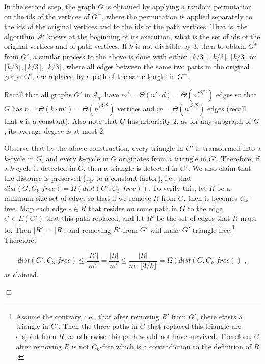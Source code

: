\documentclass{article}
\newcommand{\eps}{\epsilon}
\newcommand{\calA}{{\mathcal{A}}}
\newcommand{\mG}{{\mathcal{G}}}
\newcommand{\trn}{{n'}}
\newcommand{\trG}{{G'}}
\newcommand{\trm}{{m'}}
\newcommand{\trA}{{\calA'}}
\newcommand{\trR}{{R'}}
\newcommand{\tre}{e'}
\newenvironment{proofof}[1]{\smallskip\noindent{\bf Proof of #1:}}%
        {\hspace*{\fill}$\Box$\par}
\newcommand{\commentt}[1]{ {}}
\begin{document}
\begin{proofof}{Theorem~\ref{thm:lb_ck_const_alpha}}
In the second step, the graph $G$ is obtained by applying a random permutation on the ids of the vertices of $G^+$, where the permutation is applied separately to the ids of the original vertices and to the ids of the path vertices. That is, the algorithm $\trA$ knows at the beginning of its execution, what is the set of ids of the original vertices and  of path vertices. If $k$ is not divisible by $3$, then  to obtain $G^+$ from $\trG$, 
a similar process to the above is done with either $\lceil k/3\rceil, \lceil k/3\rceil, \lfloor k/3\rfloor$ or $\lceil k/3\rceil, \lfloor k/3\rfloor, \lfloor k/3\rfloor$, where all edges between the same two parts in the original graph $\trG$, are replaced by a path of the same length in $G^+$.


Recall that all graphs $\trG$ in $\mG_{\trn}$ have $\trm=\Theta(\trn\cdot d)=\Theta(\trn^{3/2})$ edges so that $G$ has $n=\Theta (k\cdot \trm)=\Theta(\trn^{3/2})$ vertices and  $m=\Theta(\trn^{3/2})$ edges (recall that $k$ is a constant). Also note that $G$ has arboricity $2$, as for any subgraph  of $G$, its average degree is at most $2$.  

Observe that by the above construction, every triangle in $\trG$ is transformed into a $k$-cycle in $G$, and every $k$-cycle in $G$ originates from a triangle in $\trG$. Therefore, if a $k$-cycle is detected in $G$, then a triangle is detected in $\trG$.
We also claim that the distance is preserved (up to a constant factor), i.e., that $dist(G, C_k\mbox{-}free)= \Omega(dist(\trG, C_3\mbox{-}free))$. 
To verify this, let $R$ be a 
minimum-size set of edges so that if we remove $R$ from $G$, then it becomes $C_k$-free. Map each edge $e\in R$ that resides on some path in $G$ to the edge $\tre\in E(\trG)$ that this path replaced, and let $\trR$ be the set of edges that $R$ maps to. Then $|\trR|= |R|$, and  removing $\trR$ from $\trG$ will make $\trG$ triangle-free.\footnote{Assume the contrary, i.e., that after removing $\trR$ from $\trG$, there exists a triangle in $\trG$. Then the three paths in $G$ that replaced this triangle are disjoint from $R$, as otherwise this path would not have survived. Therefore, $G$ after removing $R$ is not $C_k$-free which is a contradiction to the definition of $R$.} Therefore,

\begin{equation} dist(\trG, C_3\mbox{-}free)\leq \frac{|\trR|}{\trm}= \frac{|R|}{\trm}\leq \frac{|R|}{m\cdot \lfloor 3/k\rfloor}=\Omega(dist(G,C_k\mbox{-}free))\;,
\end{equation}
as claimed.



\end{proofof}
\end{document}
